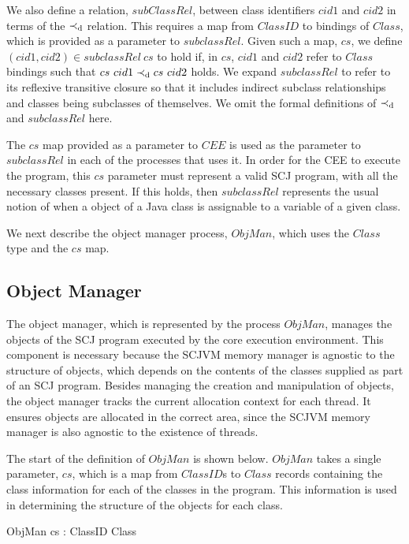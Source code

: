 We also define a relation, $subClassRel$, between class identifiers
$cid1$ and $cid2$ in terms of the $\prec_{\mathrm{d}}$ relation.
This requires a map from $ClassID$ to bindings of $Class$, which is
provided as a parameter to $subclassRel$.
Given such a map, $cs$, we define $(cid1,cid2) \in subclassRel~cs$ to
hold if, in $cs$, $cid1$ and $cid2$ refer to $Class$ bindings such
that $cs~cid1 \prec_{\mathrm{d}} cs~cid2$ holds.
We expand $subclassRel$ to refer to its reflexive transitive closure
so that it includes indirect subclass relationships and classes being
subclasses of themselves.
We omit the formal definitions of $\prec_{\mathrm{d}}$ and $subclassRel$
here.

The $cs$ map provided as a parameter to $CEE$ is used as the parameter
to $subclassRel$ in each of the processes that uses it.
In order for the CEE to execute the program, this $cs$ parameter must
represent a valid SCJ program, with all the necessary classes present.
If this holds, then $subclassRel$ represents the usual notion of when
a object of a Java class is assignable to a variable of a given class.

We next describe the object manager process, $ObjMan$, which uses the
$Class$ type and the $cs$ map.

\subsection{Object Manager}
\label{cee-object-manager-subsection}

The object manager, which is represented by the process $ObjMan$,
manages the objects of the SCJ program executed by the core execution
environment.
This component is necessary because the SCJVM memory manager is
agnostic to the structure of objects, which depends on the contents of
the classes supplied as part of an SCJ program.
Besides managing the creation and manipulation of objects, the object
manager tracks the current allocation context for each thread.
It ensures objects are allocated in the correct area, since the SCJVM
memory manager is also agnostic to the existence of threads.

The start of the definition of $ObjMan$ is shown below.
$ObjMan$ takes a single parameter, $cs$, which is a map from
$ClassID$s to $Class$ records containing the class information for
each of the classes in the program.
This information is used in determining the structure of the objects
for each class.
\begin{circus}
  \circprocess ObjMan \circdef cs : ClassID \pfun Class \circspot \circbegin
\end{circus}

